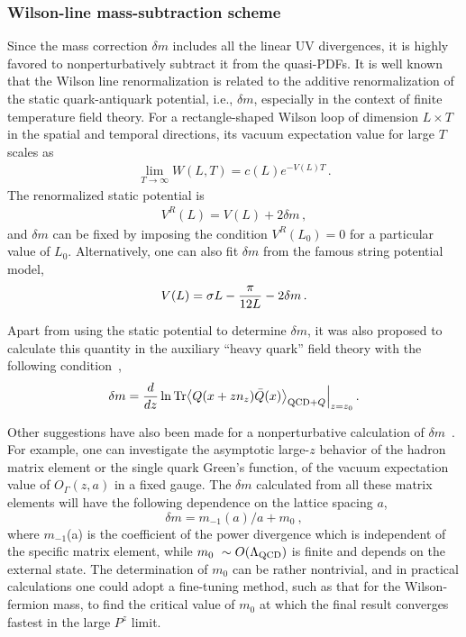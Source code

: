 \documentclass[aps,rmp,reprint,amsmath,amssymb,graphicx,longbibliography]{revtex4-1} %
\begin{document}
\subsubsection{Wilson-line mass-subtraction scheme}
\label{sec:renorm-npr-mass}

Since the mass correction $\delta m$ includes all the linear UV divergences, it is highly favored to nonperturbatively subtract it from the quasi-PDFs. It is well known that the Wilson line renormalization is related to the additive renormalization of the static quark-antiquark potential, i.e., $\delta m$, especially in the context of finite temperature field theory. For a rectangle-shaped Wilson loop of dimension $L\times T$ in the spatial and temporal directions, its vacuum expectation value for large $T$ scales as
\begin{align}
	\lim_{T\to\infty}W(L,T) = c(L) e^{-V(L)T}\,.
\end{align}
The renormalized static potential is
\begin{align}\label{eq:deltam1}
	V^{R}(L) = V(L) + 2\delta m\,,
\end{align}
and $\delta m$ can be fixed by imposing the condition $V^{R}(L_0)=0$ for a particular value of $L_0$. Alternatively, one can also fit $\delta m$ from the famous string potential model,
\begin{align}\label{eq:deltam2}
	V(L) = \sigma L- {\pi \over 12 L} -2\delta m\,.
\end{align}

Apart from using the static potential to determine $\delta m$, it was also proposed to calculate this quantity in the auxiliary ``heavy quark'' field theory with the following condition~\cite{Green:2017xeu},
\begin{align}\label{eq:deltam3}
	\delta m = {d\over dz} \ln{\rm Tr}\big\langle Q(x+zn_z)\bar{Q}(x)\big\rangle_{{\rm QCD}+Q} \Big|_{z=z_0}\,.
\end{align}

Other suggestions have also been made for a nonperturbative calculation of $\delta m$~\cite{Ji:2020brr}. For example, one can investigate the asymptotic large-$z$ behavior of the hadron matrix element or the single quark Green's function, of the vacuum expectation value of $O_{\Gamma}(z,a)$ in a fixed gauge. The $\delta m$ calculated from all these matrix elements will have the following dependence
on the lattice spacing $a$,
\begin{equation}
	\delta m = m_{-1}(a)/a + m_0 \ ,
\end{equation}
where $m_{-1}$(a) is the coefficient of the power divergence which is independent of the specific matrix element, while $m_0~\sim O(\Lambda_{\rm QCD})$ is finite and depends on the external state.
The determination of $m_0$ can be rather nontrivial, and in practical calculations one could adopt a fine-tuning method, such as that for the Wilson-fermion mass, to find the critical value of $m_0$ at which the final result converges fastest in the large $P^z$ limit.
\end{document}
